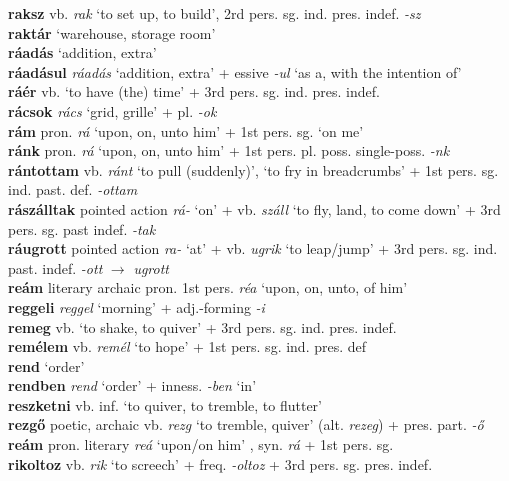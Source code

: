\documentclass[11pt]{article}
\begin{document}
\textbf{raksz} vb. \emph{rak} `to set up, to build', 2rd
pers. sg. ind. pres. indef. \emph{-sz} \\
\textbf{raktár} `warehouse, storage room' \\
\textbf{ráadás} `addition, extra' \\
\textbf{ráadásul} \emph{ráadás} `addition, extra' + essive
  \emph{-ul} `as a, with the intention of' \\
\textbf{ráér} vb. `to have (the) time' + 3rd
pers. sg. ind. pres. indef. \\
\textbf{rácsok} \emph{rács} `grid, grille' + pl. \emph{-ok} \\
\textbf{rám} pron. \emph{rá} `upon, on, unto him' + 1st
pers. sg. `on me' \\
\textbf{ránk} pron. \emph{rá} `upon, on, unto him' + 1st
pers. pl. poss. single\hyp{}poss. \emph{-nk} \\
\textbf{rántottam} vb. \emph{ránt} `to pull (suddenly)', `to fry in
breadcrumbs' + 1st pers. sg. ind. past. def. \emph{-ottam} \\
\textbf{rászálltak} pointed action \emph{rá-} `on' + vb. \emph{száll}
`to fly, land, to come down' + 3rd pers. sg. past indef. \emph{-tak} \\
\textbf{ráugrott} pointed action \emph{ra-} `at' + vb. \emph{ugrik}
`to leap/jump' + 3rd pers. sg. ind. past. indef. \emph{-ott}
$\rightarrow$ \emph{ugrott} \\
\textbf{reám} literary archaic pron. 1st pers. \emph{réa} `upon, on, unto,
of
him' \\
\textbf{reggeli} \emph{reggel} `morning' + adj.\hyp{}forming \emph{-i} \\
\textbf{remeg} vb. `to shake, to quiver' + 3rd
pers. sg. ind. pres. indef. \\
\textbf{remélem} vb. \emph{remél} `to hope' + 1st
pers. sg. ind. pres. def  \\
\textbf{rend} `order' \\
\textbf{rendben} \emph{rend} `order' + inness. \emph{-ben} `in' \\
\textbf{reszketni} vb. inf. `to quiver, to tremble, to flutter' \\
\textbf{rezgő} poetic, archaic vb. \emph{rezg} `to tremble, quiver'
(alt. \emph{rezeg}) + pres. part. \emph{-ő} \\
\textbf{reám} pron. literary \emph{reá} `upon/on him' , syn. \emph{rá} +
1st pers. sg. \\
\textbf{rikoltoz} vb. \emph{rik} `to screech' + freq. \emph{-oltoz} +
3rd pers. sg. pres. indef. \\
\end{document}
